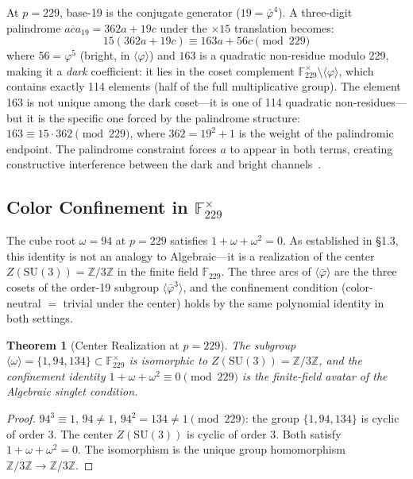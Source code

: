\documentclass[12pt,oneside]{article}
\theoremstyle{principia}
\newtheorem{theorem}{Theorem}[section]
\theoremstyle{definition}
\theoremstyle{remark}
\providecommand{\ZZ}{\mathbb{Z}}
\providecommand{\FF}{\mathbb{F}}
\providecommand{\vp}{\varphi}
\providecommand{\vpbar}{\bar{\varphi}}
\begin{document}
At $p = 229$, base-19 is the conjugate generator ($19 = \vpbar^4$). A three-digit palindrome $\overline{aca}_{19} = 362a + 19c$ under the $\times 15$ translation becomes:
\[
15(362a + 19c) \equiv 163a + 56c \pmod{229}
\]
where $56 = \vp^5$ (bright, in $\langle \vp \rangle$) and $163$ is a quadratic non-residue modulo 229, making it a \emph{dark} coefficient: it lies in the coset complement $\FF_{229}^\times \setminus \langle \vp \rangle$, which contains exactly 114 elements (half of the full multiplicative group). The element 163 is not unique among the dark coset---it is one of 114 quadratic non-residues---but it is the specific one forced by the palindrome structure: $163 \equiv 15 \cdot 362 \pmod{229}$, where $362 = 19^2 + 1$ is the weight of the palindromic endpoint. The palindrome constraint forces $a$ to appear in both terms, creating constructive interference between the dark and bright channels~\cite{larue_chromatic}.

\subsection{Color Confinement in $\FF_{229}^\times$}

The cube root $\omega = 94$ at $p = 229$ satisfies $1 + \omega + \omega^2 = 0$. As established in \S1.3, this identity is not an analogy to Algebraic---it is a realization of the center $Z(\mathrm{SU}(3)) = \ZZ/3\ZZ$ in the finite field $\FF_{229}$. The three arcs of $\langle \vpbar \rangle$ are the three cosets of the order-19 subgroup $\langle \vpbar^3 \rangle$, and the confinement condition (color-neutral $=$ trivial under the center) holds by the same polynomial identity in both settings.

\begin{theorem}[Center Realization at $p = 229$]\label{thm:center_229}
The subgroup $\langle \omega \rangle = \{1, 94, 134\} \subset \FF_{229}^\times$ is isomorphic to $Z(\mathrm{SU}(3)) = \ZZ/3\ZZ$, and the confinement identity $1 + \omega + \omega^2 \equiv 0 \pmod{229}$ is the finite-field avatar of the Algebraic singlet condition.
\end{theorem}

\begin{proof}
$94^3 \equiv 1$, $94 \neq 1$, $94^2 = 134 \neq 1 \pmod{229}$: the group $\{1, 94, 134\}$ is cyclic of order 3. The center $Z(\mathrm{SU}(3))$ is cyclic of order 3. Both satisfy $1 + \omega + \omega^2 = 0$. The isomorphism is the unique group homomorphism $\ZZ/3\ZZ \to \ZZ/3\ZZ$. \qedhere
\end{proof}
\end{document}
